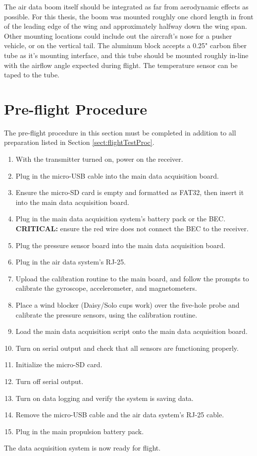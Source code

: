 The air data boom itself should be integrated as far from aerodynamic effects as possible. For this thesis, the boom was mounted roughly one chord length in front of the leading edge of the wing and approximately halfway down the wing span. Other mounting locations could include out the aircraft's nose for a pusher vehicle, or on the vertical tail. The aluminum block accepts a 0.25" carbon fiber tube as it's mounting interface, and this tube should be mounted roughly in-line with the airflow angle expected during flight. The temperature sensor can be taped to the tube.

\section{Pre-flight Procedure}
\label{sect:preFlightProc}
The pre-flight procedure in this section must be completed in addition to all preparation listed in Section \ref{sect:flightTestProc}.

\begin{enumerate}
\item With the transmitter turned on, power on the receiver.
\item Plug in the micro-USB cable into the main data acquisition board.
\item Ensure the micro-SD card is empty and formatted as FAT32, then insert it into the main data acquisition board.
\item Plug in the main data acquisition system's battery pack or the BEC. \textbf{CRITICAL:} ensure the red wire does not connect the BEC to the receiver.
\item Plug the pressure sensor board into the main data acquisition board.
\item Plug in the air data system's RJ-25.
\item Upload the calibration routine to the main board, and follow the prompts to calibrate the gyroscope, accelerometer, and magnetometers.
\item Place a wind blocker (Daisy/Solo cups work) over the five-hole probe and calibrate the pressure sensors, using the calibration routine.
\item Load the main data acquisition script onto the main data acquisition board.
\item Turn on serial output and check that all sensors are functioning properly.
\item Initialize the micro-SD card.
\item Turn off serial output.
\item Turn on data logging and verify the system is saving data.
\item Remove the micro-USB cable and the air data system's RJ-25 cable.
\item Plug in the main propulsion battery pack.
\end{enumerate}
The data acquisition system is now ready for flight.

